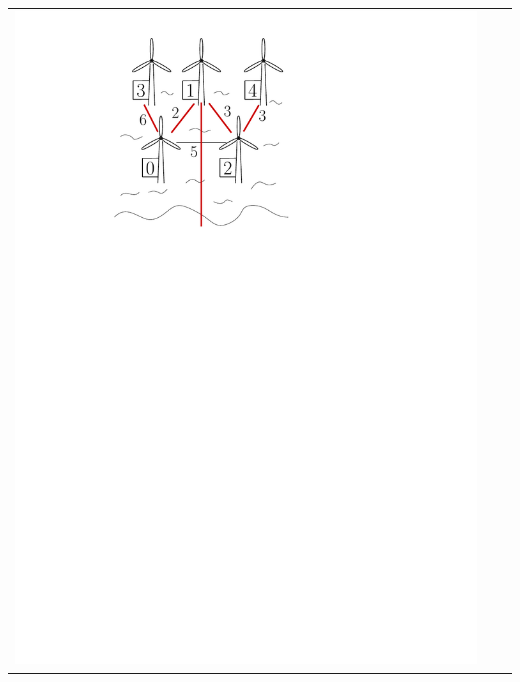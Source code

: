 \begin{center}
\begin{tabular}{p{} p{} p{}}
\includegraphics[width=\textwidth]{sample1q1} &

\end{tabular}
\end{center}
